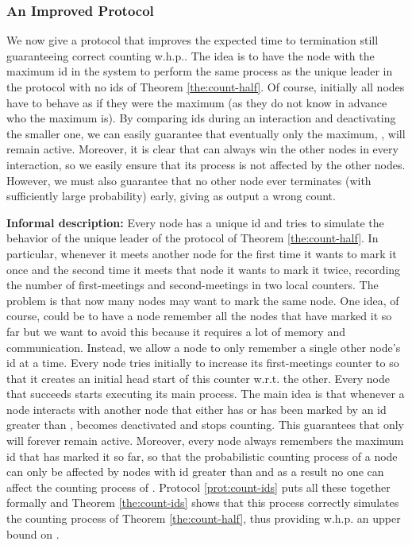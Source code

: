 \documentclass[oribibl, 11pt]{llncs}
\begin{document}
\subsubsection{An Improved Protocol}

We now give a protocol that improves the expected time to termination still guaranteeing correct counting w.h.p.. The idea is to have the node with the maximum id in the system to perform the same process as the unique leader in the protocol with no ids of Theorem \ref{the:count-half}. Of course, initially all nodes have to behave as if they were the maximum (as they do not know in advance who the maximum is). By comparing ids during an interaction and deactivating the smaller one, we can easily guarantee that eventually only the maximum, , will remain active. Moreover, it is clear that  can always win the other nodes in every interaction, so we easily ensure that its process is not affected by the other nodes. However, we must also guarantee that no other node ever terminates (with sufficiently large probability) early, giving as output a wrong count.

\textbf{Informal description:} Every node  has a unique id  and tries to simulate the behavior of the unique leader of the protocol of Theorem \ref{the:count-half}. In particular, whenever it meets another node for the first time it wants to mark it once and the second time it meets that node it wants to mark it twice, recording the number of first-meetings and second-meetings in two local counters. The problem is that now many nodes may want to mark the same node. One idea, of course, could be to have a node remember all the nodes that have marked it so far but we want to avoid this because it requires a lot of memory and communication. Instead, we allow a node to only remember a single other node's id at a time.  Every node tries initially to increase its first-meetings counter to  so that it creates an initial  head start of this counter w.r.t. the other. Every node that succeeds starts executing its main process. The main idea is that whenever a node  interacts with another node that either has or has been marked by an id greater than ,  becomes deactivated and stops counting. This guarantees that only  will forever remain active. Moreover, every node  always remembers the maximum id that has marked it so far, so that the probabilistic counting process of a node  can only be affected by nodes with id greater than  and as a result no one can affect the counting process of . Protocol \ref{prot:count-ids} puts all these together formally and Theorem \ref{the:count-ids} shows that this process correctly simulates the counting process of Theorem \ref{the:count-half}, thus providing w.h.p. an upper bound on . 
\end{document}
